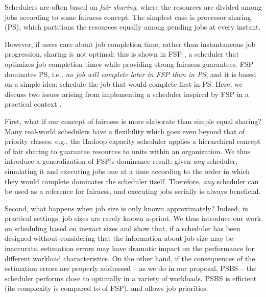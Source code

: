 \documentclass[11pt,oneside,english]{amsart}
\numberwithin{equation}{section}
\numberwithin{figure}{section}
\theoremstyle{definition}
\theoremstyle{plain}
\begin{document}
Schedulers are often based on \emph{fair sharing}, 
where the resources are divided
among jobs according to some fairness concept. The simplest case is
processor sharing (PS), which partitions the resources equally 
among pending jobs at every instant.
\begin{comment} ; many implementations are more complex: for
example, in the Hadoop capacity scheduler \cite{Zaharia2009} a
hierarchical concept of fair sharing is applied, to guarantee a given
amount of resources to units or departments within on organization,
and split excess resources again according to fairness concepts
\end{comment}
However, if users care about job completion time, 
rather than instantaneous job progression,
sharing is not optimal: this is shown in FSP \cite{
Friedman2003}, a scheduler that optimizes job completion times
while providing strong fairness guarantees. FSP dominates PS,
i.e., \emph{no job will complete later in FSP than in PS}, and it is 
based on a simple idea: schedule the job that would complete first 
in PS. Here, we discuss two issues arising from implementing a 
scheduler inspired by FSP in a practical context \cite{Pastorelli2013
}.  

First, what if our concept of fairness is more elaborate than simple
equal sharing? Many real-world schedulers have a flexibility which
goes even beyond that of priority classes: e.g., the Hadoop
capacity scheduler \cite{Zaharia2009} applies a hierarchical concept
of fair sharing to guarantee resources to units within an
organization. We thus introduce a generalization of FSP's dominance
result: given \emph{any} scheduler, simulating it and executing jobs
one at a time according to the order in which they would complete
dominates the scheduler itself. Therefore, \emph{any} scheduler can
be used as a reference for fairness, and executing jobs serially is
always beneficial.

Second, what happens when job size is only known approximately?
Indeed, in practical settings, job sizes are rarely known a-priori. 
We thus introduce our work on scheduling based on inexact sizes and 
show that, if a scheduler has been designed without considering that
the information about job size may be inaccurate, estimation errors 
may have dramatic impact on the performance for different 
workload characteristics. On the other hand, if
the consequences of the estimation errors are  
properly addressed -- as we do in our proposal,
PSBS \cite{DellAmico2014} -- the scheduler performs close to 
optimally in a variety of workloads. PSBS is efficient
(its complexity is  compared to 
of FSP), and allows 
job priorities.
\end{document}
